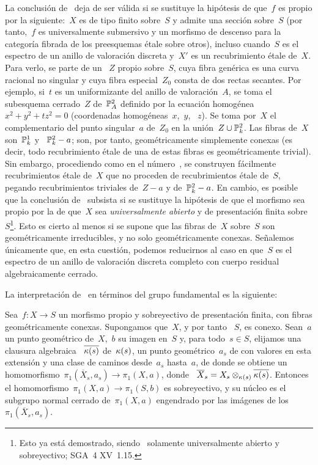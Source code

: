 \begin{remarque}
\label{IX.6.10}
La conclusión de~ deja de ser válida si se sustituye la hipótesis
de que~$f$ es propio por la siguiente:~$X$ es de tipo finito sobre~$S$ y
admite una sección sobre~$S$ (por tanto,~$f$ es universalmente submersivo y
un morfismo de descenso para la categoría fibrada de los preesquemas étale
sobre otros), incluso cuando~$S$ es el espectro de un anillo de valoración
discreta y~$X'$ es un recubrimiento étale de~$X$. Para verlo, se parte de un
~$Z$ propio sobre~$S$, cuya fibra genérica
es una curva racional no singular y cuya fibra especial~$Z_0$ consta de dos
rectas secantes. Por ejemplo, si~$t$ es un uniformizante del anillo de
valoración~$A$, se toma el subesquema cerrado~$Z$ de~$\mathbb P_A^2$ definido por
la ecuación homogénea~$x^2+y^2+tz^2=0$ (coordenadas homogéneas~$x$,~$y$,
~$z$). Se toma por~$X$ el complementario del punto singular~$a$ de~$Z_0$ en
la unión~$Z\cup\mathbb P_k^2$. Las fibras de~$X$ son~$\mathbb P_k^1$ y
~$\mathbb P_k^2-a$; son, por tanto, geométricamente simplemente conexas (es decir,
todo recubrimiento étale de una de estas fibras es geométricamente trivial).
Sin embargo,
procediendo como en el número~, se construyen fácilmente
recubrimientos étale de~$X$ que no proceden de recubrimientos étale de~$S$,
pegando recubrimientos triviales de~$Z-a$ y de~$\mathbb P_k^2-a$. En cambio, es
posible que la conclusión de~ subsista si se sustituye la
hipótesis de que el morfismo sea propio por la de que~$X$ sea
\emph{universalmente abierto} y
de presentación finita sobre~$S$\kern1pt\footnote{Esto ya está demostrado,
siendo~ solamente universalmente abierto
y sobreyectivo; \cf SGA~4 XV~1.15.}.
Esto es cierto al menos si se supone que las fibras de~$X$ sobre~$S$ son
geométricamente irreducibles, y no solo geométricamente conexas. Señalemos
únicamente que, en esta cuestión, podemos reducirnos al caso en que~$S$ es
el espectro de un anillo de valoración discreta completo con cuerpo residual
algebraicamente cerrado.
\end{remarque}

La interpretación de~ en términos del grupo fundamental es la
siguiente:

\begin{corollaire}
\label{IX.6.11}
Sea~$f\colon X\to S$ un morfismo propio y sobreyectivo de presentación
finita, con fibras geométricamente conexas. Supongamos que~$X$, y por tanto
~$S$, es conexo. Sean~$a$ un punto geométrico de~$X$,~$b$ su imagen en~$S$ y,
para todo~$s\in S$, elijamos una clausura algebraica
~$\overline{\kappa(s)}$ de~$\kappa(s)$, un punto geométrico~$a_s$ de
con valores en esta extensión y una clase de caminos desde~$a_s$ hasta~$a$, de donde
se obtiene un homomorfismo~$\pi_1(\overline X_s,a_s)\to\pi_1(X,a)$, donde
~$\overline X_s=X_s\otimes_{\kappa(s)}\overline{\kappa(s)}$. Entonces el
homomorfismo~$\pi_1(X,a)\to\pi_1(S,b)$ es sobreyectivo, y su núcleo es el
subgrupo normal cerrado de~$\pi_1(X,a)$ engendrado por las imágenes de los
~$\pi_1(\overline X_s,a_s)$.
\end{corollaire}

